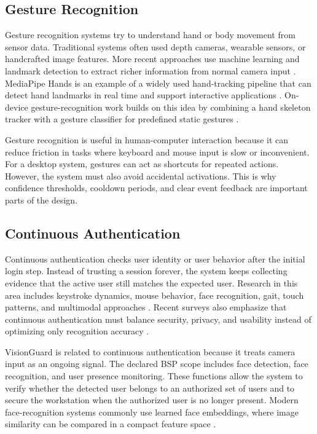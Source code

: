 \documentclass[10pt,twocolumn]{article}
\begin{document}
\subsection{Gesture Recognition}
Gesture recognition systems try to understand hand or body movement from sensor data.
Traditional systems often used depth cameras, wearable sensors, or handcrafted image features.
More recent approaches use machine learning and landmark detection to extract richer information from normal camera input \cite{oudah2020handgesture,alfarid2022structured}.
MediaPipe Hands is an example of a widely used hand-tracking pipeline that can detect hand landmarks in real time and support interactive applications \cite{zhang2020mediapipe}.
On-device gesture-recognition work builds on this idea by combining a hand skeleton tracker with a gesture classifier for predefined static gestures \cite{sung2021gesture}.

Gesture recognition is useful in human-computer interaction because it can reduce friction in tasks where keyboard and mouse input is slow or inconvenient.
For a desktop system, gestures can act as shortcuts for repeated actions.
However, the system must also avoid accidental activations.
This is why confidence thresholds, cooldown periods, and clear event feedback are important parts of the design.

\subsection{Continuous Authentication}
Continuous authentication checks user identity or user behavior after the initial login step.
Instead of trusting a session forever, the system keeps collecting evidence that the active user still matches the expected user.
Research in this area includes keystroke dynamics, mouse behavior, face recognition, gait, touch patterns, and multimodal approaches \cite{patel2016continuous}.
Recent surveys also emphasize that continuous authentication must balance security, privacy, and usability instead of optimizing only recognition accuracy \cite{baig2021security}.

VisionGuard is related to continuous authentication because it treats camera input as an ongoing signal.
The declared BSP scope includes face detection, face recognition, and user presence monitoring.
These functions allow the system to verify whether the detected user belongs to an authorized set of users and to secure the workstation when the authorized user is no longer present.
Modern face-recognition systems commonly use learned face embeddings, where image similarity can be compared in a compact feature space \cite{schroff2015facenet,deng2019arcface}.
\end{document}
